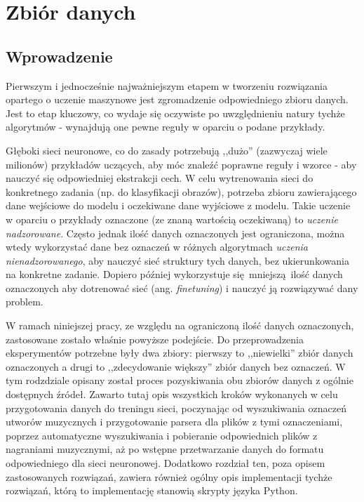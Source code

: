 \chapter{Zbiór danych}

\section{Wprowadzenie}

Pierwszym i jednocześnie najważniejszym etapem w tworzeniu rozwiązania opartego o uczenie maszynowe
jest zgromadzenie odpowiedniego zbioru danych. Jest to etap kluczowy, co wydaje się oczywiste po
uwzględnieniu natury tychże algorytmów - wynajdują one pewne reguły w oparciu o podane przykłady.

Głęboki sieci neuronowe, co do zasady potrzebują ,,dużo'' (zazwyczaj wiele milionów) przykładów
uczących, aby móc znaleźć poprawne reguły i wzorce - aby nauczyć się odpowiedniej ekstrakcji cech. W
celu wytrenowania sieci do konkretnego zadania (np. do klasyfikacji obrazów), potrzeba zbioru
zawierającego dane wejściowe do modelu i oczekiwane dane wyjściowe z modelu. Takie uczenie w oparciu
o przykłady oznaczone (ze znaną wartością oczekiwaną) to \emph{uczenie nadzorowane}. Często jednak
ilość danych oznaczonych jest ograniczona, można wtedy wykorzystać dane bez oznaczeń w różnych
algorytmach \emph{uczenia nienadzorowanego}, aby nauczyć sieć struktury tych danych, bez
ukierunkowania na konkretne zadanie. Dopiero później wykorzystuje się mniejszą ilość danych
oznaczonych aby dotrenować sieć (ang. \emph{finetuning}) i nauczyć ją rozwiązywać dany problem.

W ramach niniejszej pracy, ze względu na ograniczoną ilość danych oznaczonych, zastosowane zostało
właśnie powyższe podejście. Do przeprowadzenia eksperymentów potrzebne były dwa zbiory: pierwszy to
,,niewielki'' zbiór danych oznaczonych a drugi to ,,zdecydowanie większy'' zbiór danych bez
oznaczeń. W tym rodzdziale opisany został proces pozyskiwania obu zbiorów danych z ogólnie
dostępnych źródeł. Zawarto tutaj opis wszystkich kroków wykonanych w celu przygotowania danych do
treningu sieci, poczynając od wyszukiwania oznaczeń utworów muzycznych i przygotowanie parsera dla
plików z tymi oznaczeniami, poprzez automatyczne wyszukiwania i pobieranie odpowiednich plików z
nagraniami muzycznymi, aż po wstępne przetwarzanie danych do formatu odpowiedniego dla sieci
neuronowej. Dodatkowo rozdział ten, poza opisem zastosowanych rozwiązań, zawiera również ogólny opis
implementacji tychże rozwiązań, którą to implementację stanowią skrypty języka Python.


